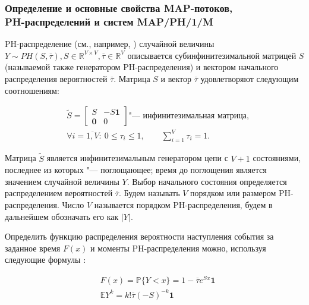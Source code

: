 \subsubsection{Определение и основные свойства MAP-потоков, \\PH-распределений и систем MAP/PH/1/M}


PH-распределение (см., например, \cite{Buchholz2014,VishnevskyDudin2018}) случайной величины $Y \sim  PH(S, \overline{\tau}), S \in \mathbb{R}^{V \times V}, \overline{\tau} \in \mathbb{R}^V$ описывается субинфинитезимальной матрицей $S$ (называемой также генератором PH-распределения) и вектором начального распределения вероятностей $\overline{\tau}$. Матрица $S$ и вектор $\overline{\tau}$ удовлетворяют следующим соотношениям:

\begin{equation}
	\label{eq:ch4-ph-def}
	\begin{aligned}
		&\tilde{S} = \begin{bmatrix}
			S  & -S\mathbf{1} \\
			\mathbf{0} &  0
		\end{bmatrix} \mbox{"--- инфинитезимальная матрица,}\\
		&\forall i = \overline{1,V}: \: 0 \leq \tau_i \leq 1, \qquad 
			\sum\limits_{i=1}^{V} \tau_i = 1.
	\end{aligned}
\end{equation}


Матрица $\tilde{S}$ является инфинитезимальным генератором цепи с $V+1$ состояниями, последнее из которых "--- поглощающее; время до поглощения является значением случайной величины $Y$. Выбор начального состояния определяется распределением вероятностей $\overline{\tau}$. Будем называть $V$ порядком или размером PH-распределения. Число $V$ называется порядком PH-распределения, будем в дальнейшем обозначать его как $|Y|$.

Определить функцию распределения вероятности наступления события за заданное время $F(x)$ и моменты PH-распределения можно, используя следующие формулы \cite{VishnevskyDudin2018,Horvath2013}:

\begin{equation}
	\label{eq:ch4-ph-props}
	\begin{aligned}
		&F(x) = \mathbb{P}\{Y < x\} = 1 - \overline{\tau} e^{Sx} \mathbf{1}\\
		&\mathbb{E}Y^k = k! \overline{\tau} (-S)^{-k} \mathbf{1}
	\end{aligned}
\end{equation}


